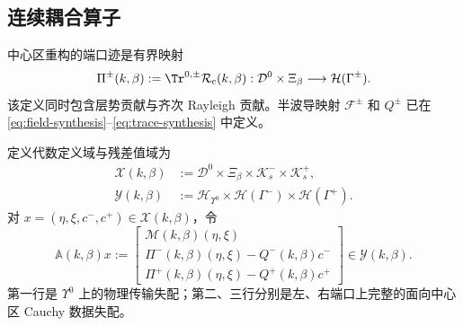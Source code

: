 \subsection{连续耦合算子}

中心区重构的端口迹是有界映射
\begin{equation}
  \Pi^\pm(k,\beta):=\Tr^{0,\pm}\mathcal R_{\mathrm c}(k,\beta):
  \mathcal D^0\times\Xi_\beta\longrightarrow\mathcal H(\Gamma^\pm).
  \label{eq:center-port-map}
\end{equation}
该定义同时包含层势贡献与齐次 Rayleigh 贡献。半波导映射 $\mathcal F^\pm$ 和 $Q^\pm$ 已在 \eqref{eq:field-synthesis}--\eqref{eq:trace-synthesis} 中定义。

\begin{definition}
\label{def:coupled-operator}
定义代数定义域与残差值域为
\begin{align}
  \mathcal X(k,\beta)
  &:=\mathcal D^0\times\Xi_\beta\times
  \mathcal K_s^-\times\mathcal K_s^+,
  \label{eq:coupled-domain}\\
  \mathcal Y(k,\beta)
  &:=\mathcal H_{\Upsilon^0}\times
  \mathcal H(\Gamma^-)\times\mathcal H(\Gamma^+).
  \label{eq:coupled-codomain}
\end{align}
对 $x=(\eta,\xi,c^-,c^+)\in\mathcal X(k,\beta)$，令
\begin{equation}
  \mathbb A(k,\beta)x:=
  \begin{bmatrix}
  \mathcal M(k,\beta)(\eta,\xi)\\
  \Pi^-(k,\beta)(\eta,\xi)-Q^-(k,\beta)c^-\\
  \Pi^+(k,\beta)(\eta,\xi)-Q^+(k,\beta)c^+
  \end{bmatrix}
  \in\mathcal Y(k,\beta).
  \label{eq:coupled-operator}
\end{equation}
第一行是 $\Upsilon^0$ 上的物理传输失配；第二、三行分别是左、右端口上完整的面向中心区 Cauchy 数据失配。


\end{definition}
